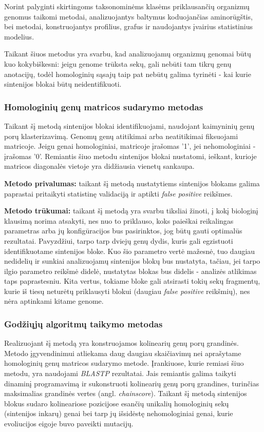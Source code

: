 \documentclass[12pt]{article}
\begin{document}
Norint palyginti skirtingoms taksonominėms klasėms priklausančių organizmų
genomus taikomi metodai, analizuojantys baltymus koduojančias aminorūgštis,
bei metodai, konstruojantys profilius, grafus ir naudojantys įvairius
statistinius modelius.

Taikant šiuos metodus yra svarbu, kad analizuojamų organizmų genomai būtų kuo
kokybiškesni: jeigu genome trūksta sekų, gali nebūti tam tikrų genų anotacijų,
todėl homologinių sąsajų taip pat nebūtų galima tyrinėti - kai kurie sintenijos
blokai būtų neidentifikuoti\cite{ARTICLE4}.

\subsubsection*{Homologinių genų matricos sudarymo metodas}
Taikant šį metodą\cite{ARTICLE4} sintenijos blokai identifikuojami, naudojant
kaimyninių genų porų klasterizavimą. Genomų genų atitikimai arba neatitikimai
fiksuojami matricoje. Jeigu genai homologiniai, matricoje įrašomas '1', jei
nehomologiniai - įrašomas '0'. Remiantis šiuo metodu sintenijos blokai
nustatomi, ieškant, kurioje matricos diagonalės vietoje yra didžiausia vienetų
sankaupa.

\textbf{Metodo privalumas:} taikant šį metodą nustatytiems sintenijos blokams
galima paprastai pritaikyti statistinę validaciją ir aptikti
\emph{false positive} reikšmes.

\textbf{Metodo trūkumai:} taikant šį metodą yra svarbu tiksliai žinoti, į kokį
biologinį klausimą norima atsakyti, nes nuo to priklauso, koks paieškai
reikalingas parametras arba jų konfigūracijos bus pasirinktos, jog būtų gauti
optimalūs rezultatai. Pavyzdžiui, tarpo tarp dviejų genų dydis, kuris gali
egzistuoti identifikuotame sintenijos bloke. Kuo šio parametro vertė mažesnė,
tuo daugiau nedidelių ir sunkiai analizuojamų sintenijos blokų bus nustatyta,
tačiau, jei tarpo ilgio parametro reikšmė didelė, nustatytas blokas bus didelis
- analizės atlikimas taps paprastesniu. Kita vertus, tokiame bloke gali
atsirasti tokių sekų fragmentų, kurie iš tiesų neturėtų priklausyti blokui
(daugiau \emph{false positive} reikšmių), nes nėra aptinkami kitame genome.

\subsubsection*{Godžiųjų algoritmų taikymo metodas}
Realizuojant šį metodą\cite{ARTICLE4} yra konstruojamos kolinearių genų porų
grandinės. Metodo į\-gy\-ven\-di\-ni\-mui atliekama daug daugiau skaičiavimų
nei aprašytame homologinių genų matricos sudarymo metode. Įrankiuose, kurie
remiasi šiuo metodu, yra naudojami \emph{BLASTP}\cite{BLASTP} rezultatai. Jais
remiantis galima taikyti dinaminį programavimą ir sukonstruoti kolinearių genų
porų grandines, turinčias maksimalias grandinės vertes
(angl. \emph{chainscore}). Taikant šį metodą sintenijos blokus sudaro
kolineariose pozicijose esančių unikalių homologinių sekų (sintenijos inkarų)
genai bei tarp jų išsidėstę nehomologiniai genai, kurie evoliucijos eigoje buvo
paveikti mutacijų.
\end{document}
